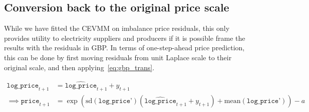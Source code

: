 \documentclass[11pt,twoside,openany]{book}
\newcommand{\code}[1]{\texttt{#1}}
\numberwithin{Theorem}{chapter}
\numberwithin{Definition}{chapter}
\numberwithin{Lemma}{chapter}
\numberwithin{Algorithm}{chapter}
\numberwithin{equation}{chapter}
\begin{document}


\FloatBarrier
\subsection{Conversion back to the original price scale}

While we have fitted the CEVMM on imbalance price residuals, this only provides
utility to electricity suppliers and producers if it is possible frame the
results with the residuals in GBP. In terms of one-step-ahead price prediction,
this can be done by first moving residuals from unit Laplace scale to their
original scale, and then applying~\eqref{eq:gbp_trans}.


  \begin{equation}\label{eq:gbp_trans}
  \begin{split}
    \code{log_price}_{t+1} &= \widehat{\code{log_price}}_{t+1} + y_{t+1}\\
    \implies \code{price}_{t+1} &=
    \exp\left(\text{sd}(\code{log_price'})
    (\widehat{\code{log_price}}_{t+1} + y_{t+1}) + \text{mean}(\code{log_price'})\right) - a
   \end{split}
\end{equation}
\end{document}

